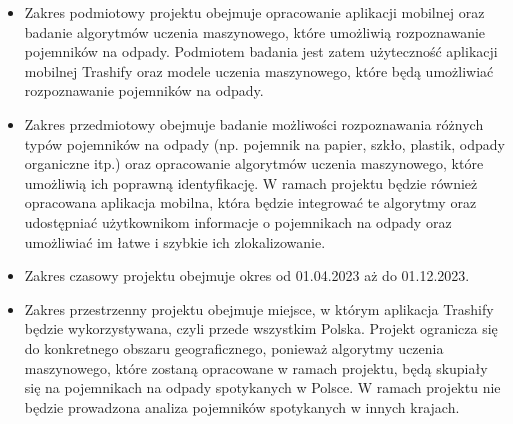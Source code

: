 \documentclass[12pt, a4paper, twoside, openany]{book}
\begin{document}
\begin{itemize}
    \item Zakres podmiotowy projektu \topic  obejmuje opracowanie aplikacji mobilnej oraz badanie algorytmów uczenia maszynowego, które umożliwią rozpoznawanie pojemników na odpady. Podmiotem badania jest zatem użyteczność aplikacji mobilnej Trashify oraz modele uczenia maszynowego, które będą umożliwiać rozpoznawanie pojemników na odpady.
    \item Zakres przedmiotowy obejmuje badanie możliwości rozpoznawania różnych typów pojemników na odpady (np. pojemnik na papier, szkło, plastik, odpady organiczne itp.) oraz opracowanie algorytmów uczenia maszynowego, które umożliwią ich poprawną identyfikację. W ramach projektu będzie również opracowana aplikacja mobilna, która będzie integrować te algorytmy oraz udostępniać użytkownikom informacje o pojemnikach na odpady oraz umożliwiać im łatwe i szybkie ich zlokalizowanie.
    \item Zakres czasowy projektu obejmuje okres od 01.04.2023 aż do 01.12.2023.
    \item Zakres przestrzenny projektu obejmuje miejsce, w którym aplikacja Trashify będzie wykorzystywana, czyli przede wszystkim Polska. Projekt ogranicza się do konkretnego obszaru geograficznego, ponieważ algorytmy uczenia maszynowego, które zostaną opracowane w ramach projektu, będą skupiały się na pojemnikach na odpady spotykanych w Polsce. W ramach projektu nie będzie prowadzona analiza pojemników spotykanych w innych krajach.
\end{itemize}
\end{document}
